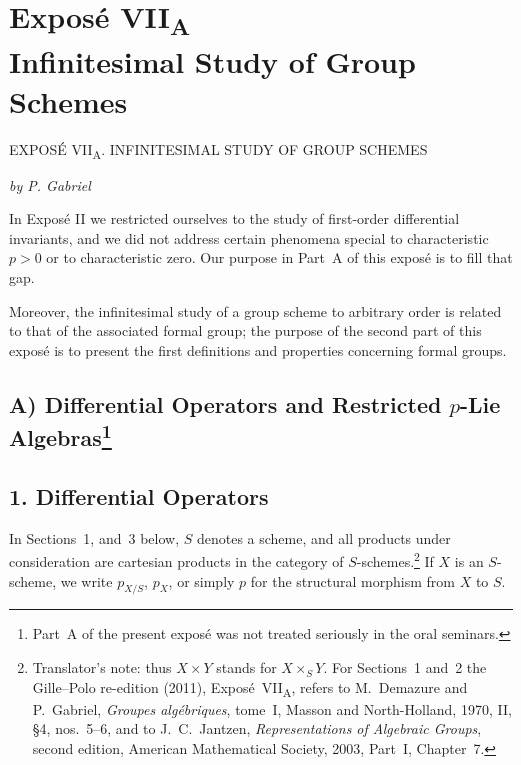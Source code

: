 
\chapter*{Expos\'e \texorpdfstring{VII\textsubscript{A}}{VII-A}\\
Infinitesimal Study of Group Schemes}
\label{sga3:VIIA:title}
%
  {EXPOS\'E VII\textsubscript{A}. INFINITESIMAL STUDY OF GROUP SCHEMES}

\begin{center}
  \textit{by P. Gabriel}
\end{center}

In Expos\'e II we restricted ourselves to the study of first-order
differential invariants, and we did not address certain phenomena special
to characteristic \(p>0\) or to characteristic zero. Our purpose in
Part~A of this expos\'e is to fill that gap.

Moreover, the infinitesimal study of a group scheme to arbitrary order is
related to that of the associated formal group; the purpose of the second
part of this expos\'e is to present the first definitions and properties
concerning formal groups.

\renewcommand{\thefootnote}{\fnsymbol{footnote}}
\setcounter{footnote}{0}
\section*{A) Differential Operators and Restricted
  \texorpdfstring{\(p\)}{p}-Lie Algebras\footnote{Part~A of the present
  expos\'e was not treated seriously in the oral seminars.}}
\label{sga3:VIIA:A}
\renewcommand{\thefootnote}{\arabic{footnote}}
\setcounter{footnote}{0}

\section*{1. Differential Operators}
\label{sga3:VIIA:1}

In Sections~1,  and~3 below, \(S\) denotes a
scheme, and all products under consideration are cartesian products in
the category of \(S\)-schemes.\footnote{Translator's note: thus
\(X\times Y\) stands for \(X\times_SY\). For Sections~1 and~2 the
Gille--Polo re-edition (2011), Expos\'e~VII\textsubscript{A}, refers to
M.~Demazure and P.~Gabriel, \textit{Groupes alg\'ebriques}, tome~I,
Masson and North-Holland, 1970, II, \S4, nos.~5--6, and to
J.~C.~Jantzen, \textit{Representations of Algebraic Groups}, second
edition, American Mathematical Society, 2003, Part~I, Chapter~7.}
If \(X\) is an \(S\)-scheme, we write \(p_{X/S}\), \(p_X\), or simply
\(p\) for the structural morphism from \(X\) to \(S\).

